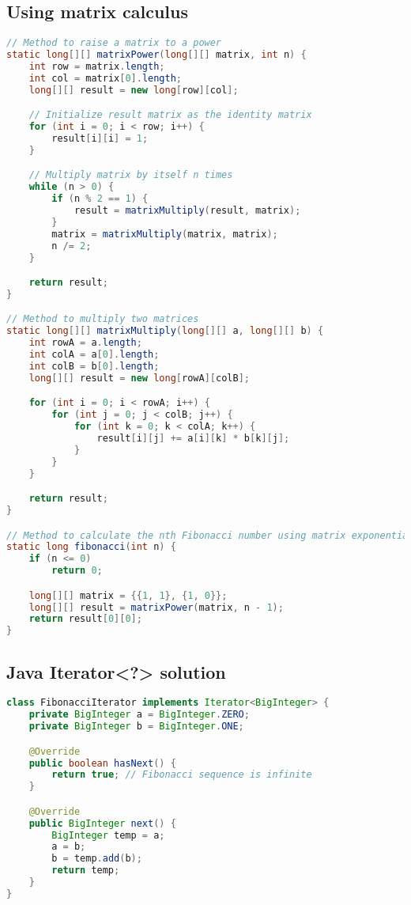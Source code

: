 \documentclass{article}
\begin{document}
\newpage
\subsection{Using matrix calculus}
\begin{lstlisting}[language=Java]
// Method to raise a matrix to a power
static long[][] matrixPower(long[][] matrix, int n) {
	int row = matrix.length;
	int col = matrix[0].length;
	long[][] result = new long[row][col];

	// Initialize result matrix as the identity matrix
	for (int i = 0; i < row; i++) {
		result[i][i] = 1;
	}

	// Multiply matrix by itself n times
	while (n > 0) {
		if (n % 2 == 1) {
			result = matrixMultiply(result, matrix);
		}
		matrix = matrixMultiply(matrix, matrix);
		n /= 2;
	}

	return result;
}

// Method to multiply two matrices
static long[][] matrixMultiply(long[][] a, long[][] b) {
	int rowA = a.length;
	int colA = a[0].length;
	int colB = b[0].length;
	long[][] result = new long[rowA][colB];

	for (int i = 0; i < rowA; i++) {
		for (int j = 0; j < colB; j++) {
			for (int k = 0; k < colA; k++) {
				result[i][j] += a[i][k] * b[k][j];
			}
		}
	}

	return result;
}

// Method to calculate the nth Fibonacci number using matrix exponentiation
static long fibonacci(int n) {
	if (n <= 0)
		return 0;

	long[][] matrix = {{1, 1}, {1, 0}};
	long[][] result = matrixPower(matrix, n - 1);
	return result[0][0];
}
\end{lstlisting}

\newpage
\subsection{Java Iterator<?> solution}
\begin{lstlisting}[language=Java]
class FibonacciIterator implements Iterator<BigInteger> {
	private BigInteger a = BigInteger.ZERO;
	private BigInteger b = BigInteger.ONE;

	@Override
	public boolean hasNext() {
		return true; // Fibonacci sequence is infinite
	}

	@Override
	public BigInteger next() {
		BigInteger temp = a;
		a = b;
		b = temp.add(b);
		return temp;
	}
}
\end{lstlisting}
\end{document}
